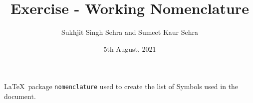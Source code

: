 \documentclass[11pt,a4paper]{article}
\title{Exercise - Working Nomenclature}
\author{Sukhjit Singh Sehra and Sumeet Kaur Sehra}
\date{5th August, 2021}
\begin{document}
\maketitle
\tableofcontents

\LaTeX\ package \verb|nomenclature| used to create the list of Symbols used in the document. 
 

\printnomenclature
\end{document}
